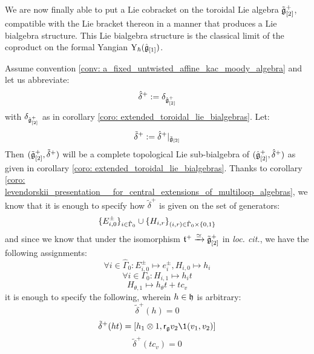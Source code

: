         We are now finally able to put a Lie cobracket on the toroidal Lie algebra $\tilde{\mathfrak{g}}_{[2]}^+$, compatible with the Lie bracket thereon in a manner that produces a Lie bialgebra structure. This Lie bialgebra structure is the classical limit of the coproduct on the formal Yangian $\mathrm{Y}_{\hbar}(\hat{\mathfrak{g}}_{[1]})$. 
        \begin{theorem} \label{theorem: toroidal_lie_bialgebras}
            Assume convention \ref{conv: a_fixed_untwisted_affine_kac_moody_algebra} and let us abbreviate:
                $$\hat{\delta}^+ := \delta_{\hat{\mathfrak{g}}_{[2]}^+}$$
            with $\delta_{\hat{\mathfrak{g}}_{[2]}^+}$ as in corollary \ref{coro: extended_toroidal_lie_bialgebras}. Let:
                $$\tilde{\delta}^+ := \hat{\delta}^+|_{\tilde{\mathfrak{g}}_{[2]}}$$
            Then $(\tilde{\mathfrak{g}}_{[2]}^+, \tilde{\delta}^+)$ will be a complete topological Lie sub-bialgebra of $(\hat{\mathfrak{g}}_{[2]}^+, \hat{\delta}^+)$ as given in corollary \ref{coro: extended_toroidal_lie_bialgebras}. Thanks to corollary \ref{coro: levendorskii_presentation__for_central_extensions_of_multiloop_algebras}, we know that it is enough to specify how $\tilde{\delta}^+$ is given on the set of generators:
                $$\{E_{i, 0}^{\pm}\}_{i \in \hat{\Gamma}_0} \cup \{H_{i, r}\}_{ (i, r) \in \hat{\Gamma}_0 \x \{0, 1\} }$$
            and since we know that under the isomorphism $\mathfrak{t}^+ \xrightarrow[]{\simeq} \tilde{\mathfrak{g}}_{[2]}^+$ in \textit{loc. cit.}, we have the following assignments:
                $$\forall i \in \hat{\Gamma}_0: E_{i, 0}^{\pm} \mapsto e_i^{\pm}, H_{i, 0} \mapsto h_i$$
                $$\forall i \in \Gamma_0: H_{i, 1} \mapsto h_i t$$
                $$H_{\theta, 1} \mapsto h_{\theta} t + t c_v$$
            it is enough to specify the following, wherein $h \in \mathfrak{h}$ is arbitrary:
                $$\tilde{\delta}^+(h) = 0$$
                $$\tilde{\delta}^+(ht) = [h_1 \tensor 1, \sfr_{\g} v_2 \1(v_1, v_2)]$$
                $$\tilde{\delta}^+(t c_v) = 0$$
        \end{theorem}
